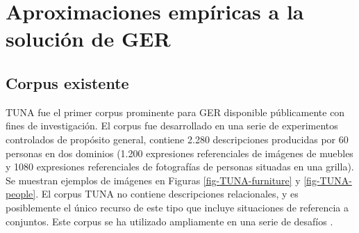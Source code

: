 %
%
%



\section{Aproximaciones emp\'iricas a la soluci\'on de GER}
\label{sec:trabajos_empiricos}
\subsection{Corpus existente}
\label{sec:corpus2}
\label{sec:corpusTUNA}


TUNA \cite{tuna-corpus} fue el primer corpus prominente para GER disponible p\'ublicamente con fines de investigaci\'on. El corpus fue desarrollado en una serie de experimentos controlados de prop\'osito general, contiene 2.280 descripciones producidas por 60 personas en dos dominios (1.200 expresiones referenciales de im\'agenes de muebles y 1080 expresiones referenciales de fotograf\'ias de personas situadas en una grilla). Se muestran ejemplos de im\'agenes en Figuras \ref{fig-TUNA-furniture} y \ref{fig-TUNA-people}. El corpus TUNA no contiene descripciones relacionales, y es posiblemente el \'unico recurso de este tipo que incluye situaciones de referencia a conjuntos. Este corpus se ha utilizado ampliamente en una serie de desaf\'ios \cite{reg2009}. 

